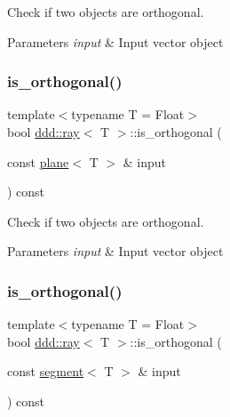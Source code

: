 Check if two objects are orthogonal. 


\begin{DoxyParams}{Parameters}
{\em input} & Input vector object \\
\hline
\end{DoxyParams}
\mbox{\label{classddd_1_1ray_a4155c7217449831487cc48c6b0fae739}} 
\subsubsection{\texorpdfstring{is\+\_\+orthogonal()}{is\_orthogonal()}\hspace{0.1cm}{\footnotesize\ttfamily [4/5]}}
{\footnotesize\ttfamily template$<$typename T = Float$>$ \\
bool \hyperlink{classddd_1_1ray}{ddd\+::ray}$<$ T $>$\+::is\+\_\+orthogonal (\begin{DoxyParamCaption}\item[{const \hyperlink{classddd_1_1plane}{plane}$<$ T $>$ \&}]{input }\end{DoxyParamCaption}) const\hspace{0.3cm}{\ttfamily [inline]}}



Check if two objects are orthogonal. 


\begin{DoxyParams}{Parameters}
{\em input} & Input vector object \\
\hline
\end{DoxyParams}
\mbox{\label{classddd_1_1ray_a1e226d670f8e75a4fc77d0ee897d9fc5}} 
\subsubsection{\texorpdfstring{is\+\_\+orthogonal()}{is\_orthogonal()}\hspace{0.1cm}{\footnotesize\ttfamily [5/5]}}
{\footnotesize\ttfamily template$<$typename T = Float$>$ \\
bool \hyperlink{classddd_1_1ray}{ddd\+::ray}$<$ T $>$\+::is\+\_\+orthogonal (\begin{DoxyParamCaption}\item[{const \hyperlink{classddd_1_1segment}{segment}$<$ T $>$ \&}]{input }\end{DoxyParamCaption}) const\hspace{0.3cm}{\ttfamily [inline]}}



